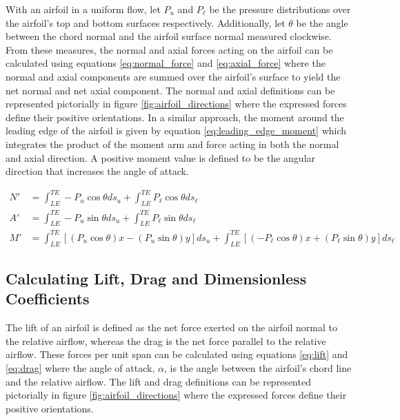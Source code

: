 \documentclass[runningheads]{llncs}
\begin{document}
\noindent
With an airfoil in a uniform flow, let $P_u$ and $P_\ell$ be the pressure distributions over the airfoil's top and bottom surfaces respectively. Additionally, let $\theta$ be the angle between the chord normal and the airfoil surface normal measured clockwise. From these measures, the normal and axial forces acting on the airfoil can be calculated using equations \ref{eq:normal_force} and \ref{eq:axial_force} where the normal and axial components are summed over the airfoil's surface to yield the net normal and net axial component. The normal and axial definitions can be represented pictorially in figure \ref{fig:airfoil_directions} where the expressed forces define their positive orientations. In a similar approach, the moment around the leading edge of the airfoil is given by equation \ref{eq:leading_edge_moment} which integrates the product of the moment arm and force acting in both the normal and axial direction. A positive moment value is defined to be the angular direction that increases the angle of attack.\newline

\begin{align}
    N' &= \int_{LE}^{TE} -P_u\cos\theta ds_u + \int_{LE}^{TE} P_\ell\cos\theta ds_\ell
    \label{eq:normal_force}\\
    A' &= \int_{LE}^{TE} -P_u\sin\theta ds_u + \int_{LE}^{TE} P_\ell\sin\theta ds_\ell
    \label{eq:axial_force}\\
    M' &= \int_{LE}^{TE} \left[(P_u\cos\theta)x - (P_u\sin\theta)y\right]ds_u + \int_{LE}^{TE} \left[(-P_\ell\cos\theta)x + (P_\ell\sin\theta)y\right]ds_\ell
    \label{eq:leading_edge_moment}
\end{align}

\subsection{Calculating Lift, Drag and Dimensionless Coefficients}\label{sec:LDC}

\noindent
The lift of an airfoil is defined as the net force exerted on the airfoil normal to the relative airflow, whereas the drag is the net force parallel to the relative airflow. These forces per unit span can be calculated using equations \ref{eq:lift} and \ref{eq:drag} where the angle of attack, $\alpha$, is the angle between the airfoil's chord line and the relative airflow. The lift and drag definitions can be represented pictorially in figure \ref{fig:airfoil_directions} where the expressed forces define their positive orientations.\newline
\end{document}
